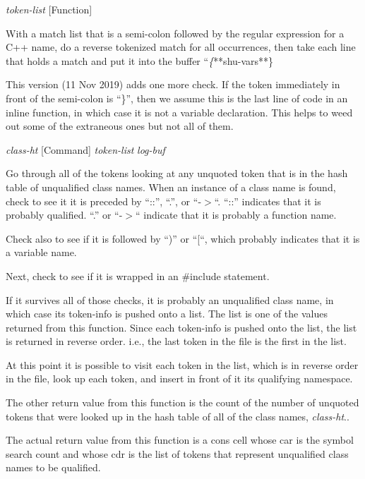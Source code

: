 \vspace{1em}
\noindent
{}
\usebox{\funcname}\emph{token-list}
 \hfill [Function]

\begin{doc-string}
With a match list that is a semi-colon followed by the regular expression for
a C++ name, do a reverse tokenized match for all occurrences, then take each
line that holds a match and put it into the buffer ``\emph\{**shu-vars**\.\}

This version (11 Nov 2019) adds one more check.  If the token immediately in
front of the semi-colon is ``\}'', then we assume this is the last line of code
in an inline function, in which case it is not a variable declaration.  This
helps to weed out some of the extraneous ones but not all of them.
\end{doc-string}

\vspace{1em}
\noindent
{}
\usebox{\funcname}\emph{class-ht}
 \hfill [Command]
\hspace*{\wd\funcname}\emph{token-list}
\hspace*{\wd\funcname}\emph{log-buf}

\begin{doc-string}
Go through all of the tokens looking at any unquoted token that is in the
hash table of unqualified class names.  When an instance of a class name is
found, check to see it it is preceded by ``::'', ``.'', or ``-$>$``.  ``::''
indicates that it is probably qualified.  ``.'' or ``-$>$`` indicate that it is
probably a function name.

Check also to see if it is followed by ``)'' or ``[``, which probably indicates
that it is a variable name.

Next, check to see if it is wrapped in an \#include statement.

If it survives all of those checks, it is probably an unqualified class name, in
which case its token-info is pushed onto a list.  The list is one of the values
returned from this function.  Since each token-info is pushed onto the list, the
list is returned in reverse order.  i.e., the last token in the file is the
first in the list.

At this point it is possible to visit each token in the list, which is in
reverse order in the file, look up each token, and insert in front of it its
qualifying namespace.

The other return value from this function is the count of the number of unquoted
tokens that were looked up in the hash table of all of the class names,
\emph{class-ht}..

The actual return value from this function is a cons cell whose car is the
symbol search count and whose cdr is the list of tokens that represent
unqualified class names to be qualified.
\end{doc-string}

